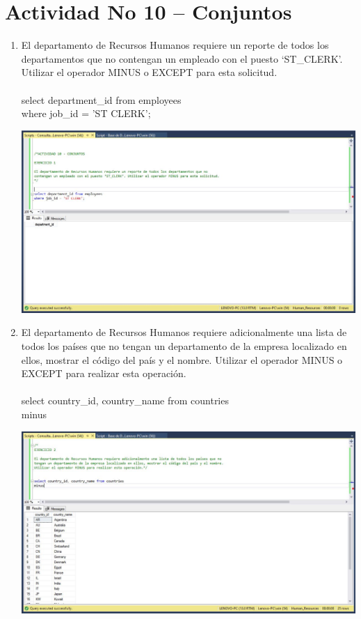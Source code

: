 \section{Actividad No 10 – Conjuntos} 
		


\begin{enumerate}[1.]
	\item El departamento de Recursos Humanos requiere un reporte de todos los departamentos que no contengan un empleado con el puesto ‘ST\_CLERK’. Utilizar el operador MINUS o EXCEPT para esta solicitud.
	\\
	\\select department\_id from employees
	\\where job\_id = 'ST CLERK';

	\begin{center}
	\includegraphics[width=17cm]{./Imagenes/Actividad10-Ejercicio01} 
	\end{center}

	\item El departamento de Recursos Humanos requiere adicionalmente una lista de todos los pa\'ises que no tengan un departamento de la empresa localizado en ellos, mostrar el código del país y el nombre. Utilizar el operador MINUS o EXCEPT para realizar esta operaci\'on.
	\\
	\\select country\_id, country\_name from countries
	\\minus

	\begin{center}
	\includegraphics[width=17cm]{./Imagenes/Actividad10-Ejercicio02} 
	\end{center}


\end{enumerate}
